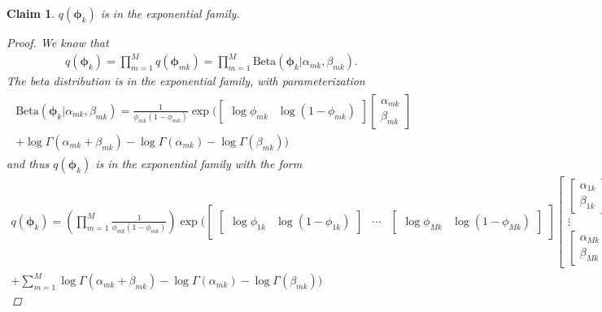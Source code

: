 \documentclass[11pt]{article}
\newtheorem{claim}{Claim}
\begin{document}
\begin{claim}
$q(\bm{\phi}_k)$ is in the exponential family.
\begin{proof}
We know that
\begin{align*}
q(\bm{\phi}_k)  = \prod\limits_{m=1}^M q(\bm{\phi}_{mk}) = \prod\limits_{m=1}^M \mathrm{Beta}(\bm{\phi}_k | \alpha_{mk}, \beta_{mk}).
\end{align*}
The beta distribution is in the exponential family, with parameterization 
\begin{align}
\begin{split}
\mathrm{Beta}(\bm{\phi}_k |  \alpha_{mk}, \beta_{mk}) =  \frac{1}{\phi_{mk}(1 - \phi_{mk})} \exp \bigg(
		\begin{bmatrix}
			\log\phi_{mk} & \log(1 - \phi_{mk})
		\end{bmatrix}
		\begin{bmatrix}
			\alpha_{mk} \\ \beta_{mk}
		\end{bmatrix} \\
+ \log \Gamma(\alpha_{mk} + \beta_{mk}) - \log \Gamma(\alpha_{mk}) - \log\Gamma(\beta_{mk}) \bigg)
\end{split}
\end{align}
and thus $q(\bm{\phi}_k)$ is in the exponential family with the form
\begin{align*}
q(\bm{\phi}_k) = \left(\prod\limits_{m=1}^M \frac{1}{\phi_{mk}(1 - \phi_{mk})} \right) \exp\bigg(
			\begin{bmatrix}
				\begin{bmatrix}
				 \log\phi_{1k} & \log(1 - \phi_{1k} )
				\end{bmatrix} & \cdots &
				\begin{bmatrix}
				 \log\phi_{Mk} & \log(1 - \phi_{Mk})
				\end{bmatrix}
			\end{bmatrix}
			\begin{bmatrix}
				\begin{bmatrix}
				\alpha_{1k} \\ \beta_{1k} 
				\end{bmatrix} \\
				\vdots \\
				\begin{bmatrix}
				\alpha_{Mk} \\ \beta_{Mk}
				\end{bmatrix}
			\end{bmatrix} \\
			+ \sum\limits_{m=1}^M \log \Gamma(\alpha_{mk} + \beta_{mk}) - \log \Gamma(\alpha_{mk}) - \log\Gamma(\beta_{mk}) \bigg)

\end{align*}
\end{proof}
\end{claim}
\end{document}
